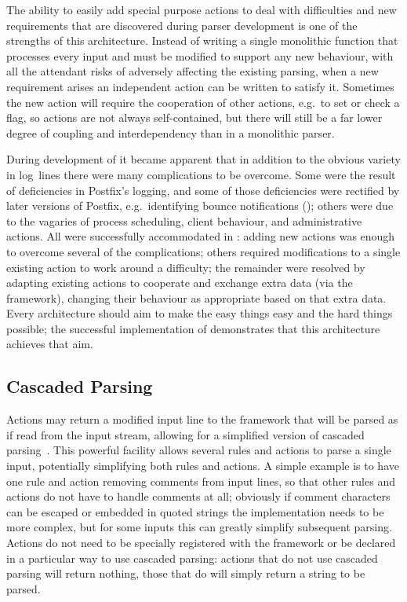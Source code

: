 The ability to easily add special purpose actions to deal with difficulties
and new requirements that are discovered during parser development is one
of the strengths of this architecture.  Instead of writing a single
monolithic function that processes every input and must be modified to
support any new behaviour, with all the attendant risks of adversely
affecting the existing parsing, when a new requirement arises an
independent action can be written to satisfy it.  Sometimes the new action
will require the cooperation of other actions, e.g.\ to set or check a
flag, so actions are not always self-contained, but there will still be a
far lower degree of coupling and interdependency than in a monolithic
parser.

During development of \parsername{} it became apparent that in addition to
the obvious variety in log~lines there were many complications to be
overcome.  Some were the result of deficiencies in Postfix's logging, and
some of those deficiencies were rectified by later versions of Postfix,
e.g.\ identifying bounce notifications
(); others were due to the
vagaries of process scheduling, client behaviour, and administrative
actions.  All were successfully accommodated in \parsername{}: adding new
actions was enough to overcome several of the complications; others
required modifications to a single existing action to work around a
difficulty; the remainder were resolved by adapting existing actions to
cooperate and exchange extra data (via the framework), changing their
behaviour as appropriate based on that extra data.  Every architecture
should aim to make the easy things easy and the hard things possible; the
successful implementation of \parsername{} demonstrates that this
architecture achieves that aim.

\subsection{Cascaded Parsing}

\label{cascaded parsing}

Actions may return a modified input line to the framework that will be
parsed as if read from the input stream, allowing for a simplified version
of cascaded parsing~\cite{cascaded-parsing}.  This powerful facility allows
several rules and actions to parse a single input, potentially simplifying
both rules and actions.  A simple example is to have one rule and action
removing comments from input lines, so that other rules and actions do not
have to handle comments at all; obviously if comment characters can be
escaped or embedded in quoted strings the implementation needs to be more
complex, but for some inputs this can greatly simplify subsequent parsing.
Actions do not need to be specially registered with the framework or be
declared in a particular way to use cascaded parsing: actions that do not
use cascaded parsing will return nothing, those that do will simply return
a string to be parsed.

